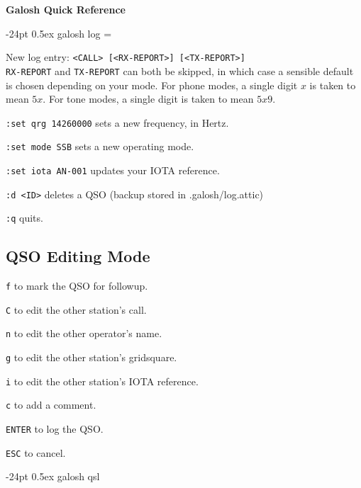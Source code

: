 \documentclass[10pt,landscape,a4paper]{article}
\makeatletter
\renewcommand\section{\@startsection{section}{1}{0mm}%
                                     {-24pt}%
                                     {0.5ex}%
                                {\large\bfseries}}
\newcommand{\code}{\texttt}
\makeatother
\begin{document}
\footnotesize
\begin{multicols*}{3}

\setlength{\premulticols}{1pt}
\setlength{\postmulticols}{1pt}
\setlength{\multicolsep}{1pt}
\setlength{\columnsep}{2pt}

\begin{center}
     \Large{\textbf{Galosh Quick Reference}} \\
\end{center}

\section{galosh log}
\everypar={\hangindent=9mm}

New log entry: \code{<CALL> [<RX-REPORT>] [<TX-REPORT>]} \\
\code{RX-REPORT} and \code{TX-REPORT} can both be skipped, in which case
a sensible default is chosen depending on your mode.  For phone modes, a
single digit $x$ is taken to mean $5x$.  For tone modes, a single digit is
taken to mean $5x9$.

\code{:set qrg 14260000} sets a new frequency, in Hertz.

\code{:set mode SSB} sets a new operating mode.

\code{:set iota AN-001} updates your IOTA reference.

\code{:d <ID>} deletes a QSO (backup stored in .galosh/log.attic)

\code{:q} quits.

\subsection{QSO Editing Mode}

\code{f} to mark the QSO for followup.

\code{C} to edit the other station's call.

\code{n} to edit the other operator's name.

\code{g} to edit the other station's gridsquare.

\code{i} to edit the other station's IOTA reference.

\code{c} to add a comment.

\code{ENTER} to log the QSO.

\code{ESC} to cancel.

\section{galosh qsl}


\end{multicols*}
\end{document}
